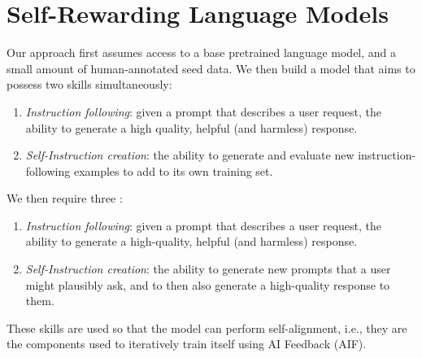 \documentclass{article}
\begin{document}
\section{Self-Rewarding Language Models}

Our approach first assumes access to a base pretrained language model, and a small amount of human-annotated seed data.
We then build a model that aims to possess two skills simultaneously:
\begin{enumerate} %
\item {\em Instruction following}: given a prompt that describes a user request, the ability to generate a high quality, helpful (and harmless) response. 
\item {\em Self-Instruction creation}: the ability to generate and evaluate
new instruction-following examples %
to add to its own training set.
\end{enumerate}

We then require three :
\begin{enumerate}
\item {\em Instruction following}: given a prompt that describes a user request, the ability to generate a high-quality, helpful (and harmless) response. 
\item {\em Self-Instruction creation}: the ability to generate new prompts that a user might plausibly ask, and to then also generate a high-quality response to them.
\end{enumerate}
\fi

These skills are used so that the model can perform self-alignment, i.e., they are the components used to iteratively train itself using AI Feedback (AIF). %
\end{document}
